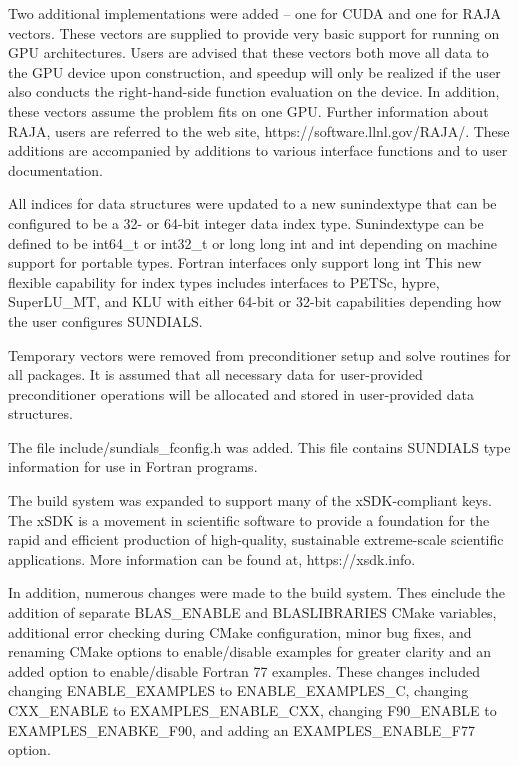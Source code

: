 Two additional {\nvector} implementations were added -- one for
CUDA and one for RAJA vectors.  
These vectors are supplied to provide very basic support for running
on GPU architectures.  Users are advised that these vectors both move all data
to the GPU device upon construction, and speedup will only be realized if the
user also conducts the right-hand-side function evaluation on the device.
In addition, these vectors assume the problem fits on one GPU.
Further information about RAJA, users are referred to the web site, 
https://software.llnl.gov/RAJA/.
These additions are accompanied by additions to various interface functions
and to user documentation.

All indices for data structures were updated to a new sunindextype that
can be configured to be a 32- or 64-bit integer data index type. 
Sunindextype can be defined to be int64\_t or int32\_t or long long int and 
int depending on machine support for portable types.  
Fortran interfaces only support long int
This new flexible capability for index types includes interfaces to 
PETSc, hypre, SuperLU\_MT, and KLU with 
either 64-bit or 32-bit capabilities depending how the user configures 
SUNDIALS.

Temporary vectors were removed from preconditioner setup and solve
   routines for all packages.  It is assumed that all necessary data
   for user-provided preconditioner operations will be allocated and
   stored in user-provided data structures.

The file include/sundials\_fconfig.h was added.  This file contains 
SUNDIALS type information for use in Fortran programs.

The build system was expanded to support many of the xSDK-compliant keys. 
The xSDK is a movement in scientific software to provide a foundation for the
rapid and efficient production of high-quality, 
sustainable extreme-scale scientific applications.  More information can
be found at, https://xsdk.info.

In addition, numerous changes were made to the build system.
Thes einclude the addition of separate BLAS\_ENABLE and BLASLIBRARIES 
CMake variables, additional error checking during CMake configuration,
minor bug fixes, and renaming CMake options to enable/disable examples 
for greater clarity and an added option to enable/disable Fortran 77 examples.
These changes included changing ENABLE\_EXAMPLES to ENABLE\_EXAMPLES\_C, 
changing CXX\_ENABLE to EXAMPLES\_ENABLE\_CXX, changing F90\_ENABLE to 
EXAMPLES\_ENABKE\_F90, and adding an EXAMPLES\_ENABLE\_F77 option.

